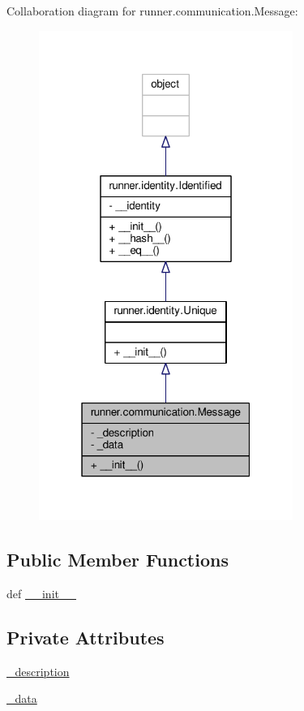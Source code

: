 Collaboration diagram for runner.\+communication.\+Message\+:
\nopagebreak
\begin{figure}[H]
\begin{center}
\leavevmode
\includegraphics[width=235pt]{classrunner_1_1communication_1_1Message__coll__graph}
\end{center}
\end{figure}
\subsection*{Public Member Functions}
\begin{DoxyCompactItemize}
\item 
def \hyperlink{classrunner_1_1communication_1_1Message_a0f91f2247e9af38a35c30be3c6849902}{\+\_\+\+\_\+init\+\_\+\+\_\+}
\end{DoxyCompactItemize}
\subsection*{Private Attributes}
\begin{DoxyCompactItemize}
\item 
\hyperlink{classrunner_1_1communication_1_1Message_a2d296c52f3bfc5e8a90dd9e3adffd3ab}{\+\_\+description}
\item 
\hyperlink{classrunner_1_1communication_1_1Message_a8e585ae52598620f8677e297b4ec0717}{\+\_\+data}
\end{DoxyCompactItemize}


